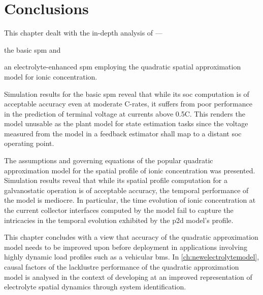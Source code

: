 \section{Conclusions}

This chapter dealt with the in-depth analysis of ---
\begin{enumerate*}[label=\itshape\alph*\upshape)]
    \item the basic \gls{spm} and
    \item an electrolyte-enhanced \gls{spm} employing the quadratic spatial approximation model for ionic concentration.
\end{enumerate*}
Simulation results for  the basic \gls{spm}  reveal that   while its  \gls{soc}
computation is of acceptable accuracy even at moderate C-rates, it suffers from
poor performance in the prediction of terminal voltage at currents above  0.5C.
This renders the model unusable as the  plant model  for  state estimation tasks
since the  voltage measured from the  model  in a  feedback estimator shall  map
to a   distant \gls{soc} operating point.


The  assumptions  and governing equations of the popular quadratic approximation
model for the spatial profile of  ionic concentration was presented. Simulation
results reveal that while its spatial  profile computation for a galvanostatic
operation is of  acceptable accuracy, the temporal  performance of the model  is
mediocre. In particular, the time evolution of ionic concentration at the
current collector interfaces computed by the model fail to capture the
intricacies in the temporal evolution exhibited by  the \gls{p2d} model's
profile.

This chapter concludes with a view that accuracy of the quadratic approximation
model needs to be improved upon before deployment in applications involving
highly dynamic load profiles such as a vehicular \gls{bms}. In
\cref{ch:newelectrolytemodel}, causal factors of the  lacklustre
performance of the quadratic approximation model is analysed in the context of
developing  at an improved representation of
electrolyte spatial dynamics through system identification.

